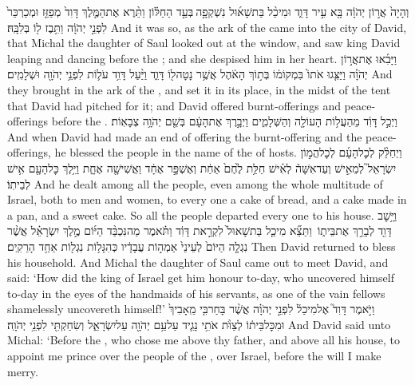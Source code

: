 {וְהָיָה֙ אֲר֣וֹן יְהֹוָ֔ה בָּ֖א עִ֣יר דָּוִ֑ד וּמִיכַ֨ל בַּת\maqqaf שָׁא֜וּל נִשְׁקְפָ֣ה \legarmeh  בְּעַ֣ד הַחַלּ֗וֹן וַתֵּ֨רֶא אֶת\maqqaf הַמֶּ֤לֶךְ דָּוִד֙ מְפַזֵּ֤ז וּמְכַרְכֵּר֙ לִפְנֵ֣י יְהֹוָ֔ה וַתִּ֥בֶז ל֖וֹ בְּלִבָּֽהּ׃}
{And it was so, as the ark of the \lord\space came into the city of David, that Michal the daughter of Saul looked out at the window, and saw king David leaping and dancing before the \lord; and she despised him in her heart.}
{וַיָּבִ֜אוּ אֶת\maqqaf אֲר֣וֹן יְהֹוָ֗ה וַיַּצִּ֤גוּ אֹתוֹ֙ בִּמְקוֹמ֔וֹ בְּת֣וֹךְ הָאֹ֔הֶל אֲשֶׁ֥ר נָטָה\maqqaf ל֖וֹ דָּוִ֑ד וַיַּ֨עַל דָּוִ֥ד עֹל֛וֹת לִפְנֵ֥י יְהֹוָ֖ה וּשְׁלָמִֽים׃}
{And they brought in the ark of the \lord, and set it in its place, in the midst of the tent that David had pitched for it; and David offered burnt-offerings and peace-offerings before the \lord.}
{וַיְכַ֣ל דָּוִ֔ד מֵהַעֲל֥וֹת הָעוֹלָ֖ה וְהַשְּׁלָמִ֑ים וַיְבָ֣רֶךְ אֶת\maqqaf הָעָ֔ם בְּשֵׁ֖ם יְהֹוָ֥ה צְבָאֽוֹת׃}
{And when David had made an end of offering the burnt-offering and the peace-offerings, he blessed the people in the name of the \lord\space of hosts.}
{וַיְחַלֵּ֨ק לְכׇל\maqqaf הָעָ֜ם לְכׇל\maqqaf הֲמ֣וֹן יִשְׂרָאֵל֮ לְמֵאִ֣ישׁ וְעַד\maqqaf אִשָּׁה֒ לְאִ֗ישׁ חַלַּ֥ת לֶ֙חֶם֙ אַחַ֔ת וְאֶשְׁפָּ֣ר אֶחָ֔ד וַאֲשִׁישָׁ֖ה אֶחָ֑ת וַיֵּ֥לֶךְ כׇּל\maqqaf הָעָ֖ם אִ֥ישׁ לְבֵיתֽוֹ׃}
{And he dealt among all the people, even among the whole multitude of Israel, both to men and women, to every one a cake of bread, and a cake made in a pan, and a sweet cake. So all the people departed every one to his house.}
{וַיָּ֥שׇׁב דָּוִ֖ד לְבָרֵ֣ךְ אֶת\maqqaf בֵּית֑וֹ \setuma  וַתֵּצֵ֞א מִיכַ֤ל בַּת\maqqaf שָׁאוּל֙ לִקְרַ֣את דָּוִ֔ד וַתֹּ֗אמֶר מַה\maqqaf נִּכְבַּ֨ד הַיּ֜וֹם מֶ֣לֶךְ יִשְׂרָאֵ֗ל אֲשֶׁ֨ר נִגְלָ֤ה הַיּוֹם֙ לְעֵינֵי֙ אַמְה֣וֹת עֲבָדָ֔יו כְּהִגָּל֥וֹת נִגְל֖וֹת אַחַ֥ד הָרֵקִֽים׃}
{Then David returned to bless his household. And Michal the daughter of Saul came out to meet David, and said: ‘How did the king of Israel get him honour to-day, who uncovered himself to-day in the eyes of the handmaids of his servants, as one of the vain fellows shamelessly uncovereth himself!’}
{וַיֹּ֣אמֶר דָּוִד֮ אֶל\maqqaf מִיכַל֒ לִפְנֵ֣י יְהֹוָ֗ה אֲשֶׁ֨ר בָּחַר\maqqaf בִּ֤י מֵֽאָבִיךְ֙ וּמִכׇּל\maqqaf בֵּית֔וֹ לְצַוֺּ֨ת אֹתִ֥י נָגִ֛יד עַל\maqqaf עַ֥ם יְהֹוָ֖ה עַל\maqqaf יִשְׂרָאֵ֑ל וְשִׂחַקְתִּ֖י לִפְנֵ֥י יְהֹוָֽה׃}
{And David said unto Michal: ‘Before the \lord, who chose me above thy father, and above all his house, to appoint me prince over the people of the \lord, over Israel, before the \lord\space will I make merry.}
